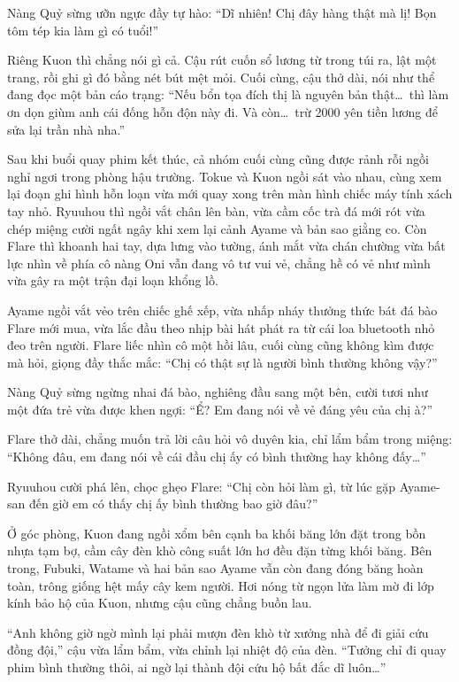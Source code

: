 \documentclass[../main.tex]{subfiles}
\begin{document}
Nàng Quỷ sừng ưỡn ngực đầy tự hào: ``Dĩ nhiên! Chị đây hàng thật mà lị! Bọn tôm tép kia làm gì có tuổi!''

Riêng Kuon thì chẳng nói gì cả. Cậu rút cuốn sổ lương từ trong túi ra, lật một trang, rồi ghi gì đó bằng nét bút mệt mỏi. Cuối cùng, cậu thở dài, nói như thể đang đọc một bản cáo trạng: ``Nếu bổn tọa đích thị là nguyên bản thật\dots\ thì làm ơn dọn giùm anh cái đống hỗn độn này đi. Và còn\dots\ trừ 2000 yên tiền lương để sửa lại trần nhà nha.''

\omk

Sau khi buổi quay phim kết thúc, cả nhóm cuối cùng cũng được rảnh rỗi ngồi nghỉ ngơi trong phòng hậu trường. Tokue và Kuon ngồi sát vào nhau, cùng xem lại đoạn ghi hình hỗn loạn vừa mới quay xong trên màn hình chiếc máy tính xách tay nhỏ. Ryuuhou thì ngồi vắt chân lên bàn, vừa cầm cốc trà đá mới rót vừa chép miệng cười ngất ngây khi xem lại cảnh Ayame và bản sao giằng co. Còn Flare thì khoanh hai tay, dựa lưng vào tường, ánh mắt vừa chán chường vừa bất lực nhìn về phía cô nàng Oni vẫn đang vô tư vui vẻ, chẳng hề có vẻ như mình vừa gây ra một trận đại loạn khổng lồ.

Ayame ngồi vắt vẻo trên chiếc ghế xếp, vừa nhấp nháy thưởng thức bát đá bào Flare mới mua, vừa lắc đầu theo nhịp bài hát phát ra từ cái loa bluetooth nhỏ đeo trên người. Flare liếc nhìn cô một hồi lâu, cuối cùng cũng không kìm được mà hỏi, giọng đầy thắc mắc: ``Chị có thật sự là người bình thường không vậy?''

Nàng Quỷ sừng ngừng nhai đá bào, nghiêng đầu sang một bên, cười tươi như một đứa trẻ vừa được khen ngợi: ``Ể? Em đang nói về vẻ đáng yêu của chị à?''

Flare thở dài, chẳng muốn trả lời câu hỏi vô duyên kia, chỉ lẩm bẩm trong miệng: ``Không đâu, em đang nói về cái đầu chị ấy có bình thường hay không đấy\dots''

Ryuuhou cười phá lên, chọc ghẹo Flare: ``Chị còn hỏi làm gì, từ lúc gặp Ayame-san đến giờ em có thấy chị ấy bình thường bao giờ đâu?''

Ở góc phòng, Kuon đang ngồi xổm bên cạnh ba khối băng lớn đặt trong bồn nhựa tạm bợ, cầm cây đèn khò công suất lớn hơ đều đặn từng khối băng. Bên trong, Fubuki, Watame và hai bản sao Ayame vẫn còn đang đóng băng hoàn toàn, trông giống hệt mấy cây kem người. Hơi nóng từ ngọn lửa làm mờ đi lớp kính bảo hộ của Kuon, nhưng cậu cũng chẳng buồn lau.

``Anh không giờ ngờ mình lại phải mượn đèn khò từ xưởng nhà để đi giải cứu đồng đội,'' cậu vừa lẩm bẩm, vừa chỉnh lại nhiệt độ của đèn. ``Tưởng chỉ đi quay phim bình thường thôi, ai ngờ lại thành đội cứu hộ bất đắc dĩ luôn\dots''
\end{document}
